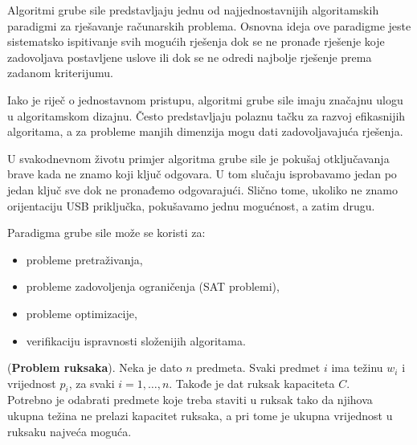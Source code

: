 Algoritmi grube sile predstavljaju jednu od najjednostavnijih algoritamskih paradigmi za rješavanje računarskih problema. Osnovna ideja ove paradigme jeste sistematsko ispitivanje svih mogućih rješenja dok se ne pronađe rješenje koje zadovoljava postavljene uslove ili dok se ne odredi najbolje rješenje prema zadanom kriterijumu.

Iako je riječ o jednostavnom pristupu, algoritmi grube sile imaju značajnu ulogu u algoritamskom dizajnu. Često predstavljaju polaznu tačku za razvoj efikasnijih algoritama, a za probleme manjih dimenzija mogu dati zadovoljavajuća rješenja.

U svakodnevnom životu primjer algoritma grube sile je pokušaj otključavanja brave kada ne znamo koji ključ odgovara. U tom slučaju isprobavamo jedan po jedan ključ sve dok ne pronađemo odgovarajući. Slično tome, ukoliko ne znamo orijentaciju USB priključka, pokušavamo jednu mogućnost, a zatim drugu.

Paradigma grube sile može se koristi za:

\begin{itemize}
	\item probleme pretraživanja,
	\item probleme zadovoljenja ograničenja (SAT problemi),
	\item probleme optimizacije,
	\item verifikaciju ispravnosti složenijih algoritama.
\end{itemize}

 

\begin{example}
	(\textbf{Problem ruksaka}). 
	Neka je dato $n$ predmeta. Svaki predmet $i$ ima težinu $w_i$ i vrijednost $p_i$, za svaki $i=1,\ldots,n$. Takođe je dat ruksak kapaciteta $C$.\\
	Potrebno je odabrati predmete koje treba staviti u ruksak tako da njihova ukupna težina ne prelazi kapacitet ruksaka, a pri tome je ukupna vrijednost u ruksaku najveća moguća.

\end{example}

